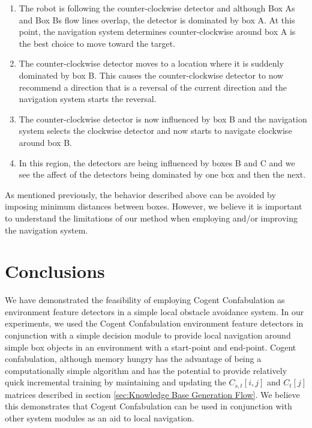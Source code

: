 \documentclass[journal]{IEEEtran}
\begin{document}
\begin{enumerate}[label=(\alph*)]
\item{The robot is following the counter-clockwise detector and
although Box A\textquotesingle s and Box B\textquotesingle s flow lines overlap, the
detector is dominated by box A. At this point, the navigation system determines counter-clockwise around box A is the best
choice to move toward the target.}
\item{The counter-clockwise detector moves to a location where it is suddenly dominated
by box B. This causes the counter-clockwise detector to now recommend a direction that is a reversal
of the current direction and the navigation system starts the reversal.}
\item{The counter-clockwise detector is now influenced by box B and the navigation system selects
the clockwise detector and now starts to navigate clockwise around box B.}
\item{In this region, the detectors are being influenced by boxes B and C and we see the affect of the
detectors being dominated by one box and then the next.}
\end{enumerate}

As mentioned previously, the behavior described above can be avoided by imposing minimum distances between boxes.
However, we believe it is important to understand the limitations of our method when employing and/or improving the navigation system.

\section{Conclusions}
\label{sec:Conclusions}
We have demonstrated the feasibility of employing Cogent Confabulation as environment feature detectors in a simple local obstacle avoidance system.
In our experiments, we used the Cogent Confabulation environment feature detectors in conjunction with a simple decision module to provide local navigation
around simple box objects in an environment with a start-point and end-point.
Cogent confabulation, although memory hungry has the advantage of being a computationally simple algorithm
and has the potential to provide relatively quick incremental training by maintaining and updating the
$C_{s,t}[i,j]$ and $C_{t}[j]$ matrices described in section \ref{sec:Knowledge Base Generation Flow}.
We believe this demonstrates that Cogent Confabulation can be used in conjunction with other system modules as an aid
to local navigation.
\end{document}

